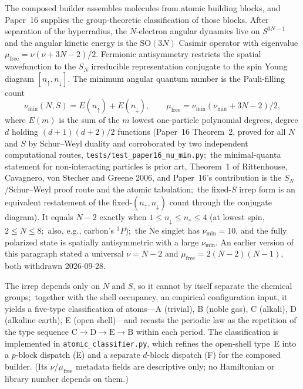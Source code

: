 \documentclass[aps,pra,twocolumn,superscriptaddress,longbibliography]{revtex4-2}
\begin{document}
The composed builder assembles molecules from atomic building blocks,
and Paper~16 supplies the group-theoretic classification of those
blocks.  After separation of the hyperradius, the $N$-electron angular
dynamics live on $S^{3N-1}$ and the angular kinetic energy is the
$\mathrm{SO}(3N)$ Casimir operator with eigenvalue
$\mu_{\mathrm{free}} = \nu(\nu + 3N - 2)/2$.  Fermionic antisymmetry
restricts the spatial wavefunction to the $S_N$ irreducible
representation conjugate to the spin Young diagram
$[n_\uparrow, n_\downarrow]$.  The minimum angular quantum number is
the Pauli-filling count
\begin{equation}
\nu_{\min}(N,S) = E(n_\uparrow) + E(n_\downarrow),\qquad
\mu_{\mathrm{free}} = \nu_{\min}(\nu_{\min} + 3N - 2)/2,
\end{equation}
where $E(m)$ is the sum of the $m$ lowest one-particle polynomial
degrees, degree $d$ holding $(d+1)(d+2)/2$ functions (Paper~16
Theorem~2, proved for all $N$ and $S$ by Schur--Weyl duality and
corroborated by two independent computational routes,
\texttt{tests/test\_paper16\_nu\_min.py};\ the minimal-quanta statement
for non-interacting particles is prior art, Theorem~1 of Rittenhouse,
Cavagnero, von Stecher and Greene 2006, and Paper~16's contribution is
the $S_N$/Schur--Weyl proof route and the atomic tabulation;\ the
fixed-$S$ irrep form is an equivalent restatement of the
fixed-$(n_\uparrow, n_\downarrow)$ count through the conjugate
diagram).  It equals $N-2$ exactly when
$1 \le n_\downarrow \le n_\uparrow \le 4$ (at lowest spin,
$2 \le N \le 8$;\ also, e.g., carbon's ${}^3P$);\ the Ne singlet has
$\nu_{\min} = 10$, and the fully polarized state is spatially
antisymmetric with a large $\nu_{\min}$.  An earlier version of this
paragraph stated a universal $\nu = N-2$ and $\mu_{\mathrm{free}} =
2(N-2)(N-1)$, both withdrawn 2026-09-28.

The irrep depends only on $N$ and $S$, so it cannot by itself separate
the chemical groups;\ together with the shell occupancy, an empirical
configuration input, it yields a five-type classification of atoms---A (trivial), B
(noble gas), C (alkali), D (alkaline earth), E (open shell)---and recasts
the periodic law as the repetition of the type sequence
$\mathrm{C}\to\mathrm{D}\to\mathrm{E}\to\mathrm{B}$ within each period.
The classification is implemented in \texttt{atomic\_classifier.py},
which refines the open-shell type~E into a $p$-block dispatch (E) and a
separate $d$-block dispatch (F) for the composed builder.  (Its
$\nu$/$\mu_{\mathrm{free}}$ metadata fields are descriptive only; no
Hamiltonian or library number depends on them.)
\end{document}
